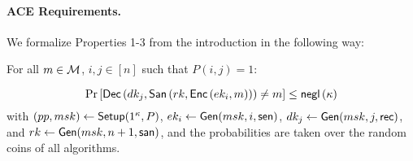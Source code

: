 \documentclass{llncs}
\begin{document}
\paragraph{ACE Requirements.} We formalize Properties 1-3 from the introduction in the following way: 


\begin{defi}[Correctness] \label{def:ACE-correct}\label{def:one-correct}
For all $m\in \mathcal{M}$, $i,j \in[n]$ such that $P(i,j)=1$:

$$
\Pr\left[ \mathsf{Dec}\left(dk_j, \mathsf{San}\left(rk, \mathsf{Enc}\left(ek_i ,m\right) \right)\right) \neq m  \right] \leq \mathsf{negl}\left(\kappa\right)
$$
with $(pp,msk)\leftarrow \mathsf{Setup}(1^\kappa,P)$, $ek_i\leftarrow \mathsf{Gen}(msk,i,\mathsf{sen})$, $dk_j\leftarrow \mathsf{Gen}(msk,j,\mathsf{rec})$, and $rk \leftarrow \mathsf{Gen}(msk,n+1,\mathsf{san})$, and the probabilities are taken over the random coins of all algorithms.
\end{defi}
\end{document}
